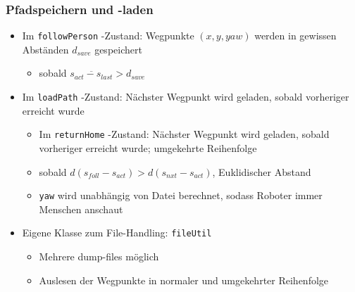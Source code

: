 


\subsubsection{Pfadspeichern und -laden}

\begin{itemize}
  \item Im \lstinline{followPerson} -Zustand: Wegpunkte $(x,y,yaw)$ werden in gewissen Abständen $d_{save}$ gespeichert
  \begin{itemize}
    \item sobald $ \overline{ s_{act} - s_{last} } > d_{save} $ 
  \end{itemize}
	\item Im \lstinline{loadPath} -Zustand: Nächster Wegpunkt wird geladen, sobald vorheriger erreicht wurde
  \begin{itemize}
		\item Im \lstinline{returnHome} -Zustand: Nächster Wegpunkt wird geladen, sobald vorheriger erreicht wurde; umgekehrte Reihenfolge
    \item sobald $ d( s_{foll} - s_{act} ) > d( s_{nxt} - s_{act} ) $, Euklidischer Abstand
  	\item \lstinline{yaw} wird unabhängig von Datei berechnet, sodass Roboter immer Menschen anschaut
  \end{itemize}
  \item Eigene Klasse zum File-Handling: \lstinline{fileUtil}
  \begin{itemize}
    \item Mehrere dump-files möglich
    \item Auslesen der Wegpunkte in normaler und umgekehrter Reihenfolge
  \end{itemize}
\end{itemize}



% 
% 


